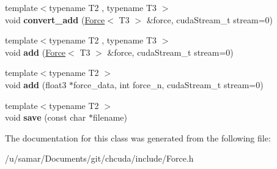 \begin{DoxyCompactItemize}
\item 
\hypertarget{classForce_aeea10a84a5b21b5be98fde0f7087a38a}{}\label{classForce_aeea10a84a5b21b5be98fde0f7087a38a} 
{\footnotesize template$<$typename T2 , typename T3 $>$ }\\void {\bfseries convert\+\_\+add} (\hyperlink{classForce}{Force}$<$ T3 $>$ \&force, cuda\+Stream\+\_\+t stream=0)
\item 
\hypertarget{classForce_aa8faecd8fa1ef693649ecb84e8ff43c5}{}\label{classForce_aa8faecd8fa1ef693649ecb84e8ff43c5} 
{\footnotesize template$<$typename T2 , typename T3 $>$ }\\void {\bfseries add} (\hyperlink{classForce}{Force}$<$ T3 $>$ \&force, cuda\+Stream\+\_\+t stream=0)
\item 
\hypertarget{classForce_a16ce29fcd48b9679d9e61f0602f9163e}{}\label{classForce_a16ce29fcd48b9679d9e61f0602f9163e} 
{\footnotesize template$<$typename T2 $>$ }\\void {\bfseries add} (float3 $\ast$force\+\_\+data, int force\+\_\+n, cuda\+Stream\+\_\+t stream=0)
\item 
\hypertarget{classForce_a5a85c43c44b7335cd40702e1384463a3}{}\label{classForce_a5a85c43c44b7335cd40702e1384463a3} 
{\footnotesize template$<$typename T2 $>$ }\\void {\bfseries save} (const char $\ast$filename)
\end{DoxyCompactItemize}


The documentation for this class was generated from the following file\+:\begin{DoxyCompactItemize}
\item 
/u/samar/\+Documents/git/chcuda/include/Force.\+h\end{DoxyCompactItemize}
